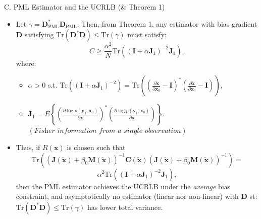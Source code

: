\documentclass{beamer}
\begin{document}
\begin{frame}{C. PML Estimator and the UCRLB (\& Theorem 1)}
\begin{itemize}
    \item Let $\gamma = \mathbf{D}_{\text{PML}}^{*} \mathbf{D}_{\text{PML}}$. Then, from Theorem 1, any estimator with bias gradient $\mathbf{D}$ satisfying $\text{Tr}(\mathbf{D}^{*}\mathbf{D}) \leq \text{Tr}(\gamma)$ must satisfy:
    \begin{equation*}
    C \geq \frac{\alpha^2}{N} \text{Tr}\left((\mathbf{I} + \alpha \mathbf{J}_1)^{-2} \mathbf{J}_1\right),
    \end{equation*}
    where: 
    \begin{itemize}
        \item $\alpha > 0$ s.t. \(
            \text{Tr}\left((\mathbf{I} + \alpha \mathbf{J}_1)^{-2}\right) = \text{Tr}\left(\left(\frac{\partial \check{\mathbf{x}}}{\partial \mathbf{x}_0} - \mathbf{I}\right)^* \left(\frac{\partial \check{\mathbf{x}}}{\partial \mathbf{x}_0} - \mathbf{I}\right)\right),
            \)
        \item $\mathbf{J}_1 = E\left\{\left(\frac{\partial \log p(\mathbf{y}_1;\mathbf{x}_0)}{\partial \mathbf{x}}\right)^* \left(\frac{\partial \log p(\mathbf{y}_1;\mathbf{x}_0)}{\partial \mathbf{x}}\right)\right\}$. \(\scriptstyle (\textit{Fisher information from a single observation})\)
    \end{itemize}

    \item Thus, if $R(\mathbf{x})$ is chosen such that 
    \[
    \text{Tr}\left((\mathbf{J}(\check{\mathbf{x}}) + \beta_0 \mathbf{M}(\check{\mathbf{x}}))^{-1} \mathbf{C}(\check{\mathbf{x}}) (\mathbf{J}(\check{\mathbf{x}}) + \beta_0 \mathbf{M}(\check{\mathbf{x}}))^{-1}\right) =
    \]
    \[
    \alpha^2 \text{Tr}\left((\mathbf{I} + \alpha \mathbf{J}_1)^{-2} \mathbf{J}_1\right),
    \]
    then the PML estimator achieves the UCRLB under the \textit{average} bias constraint, and asymptotically no estimator (linear nor non-linear) with $\mathbf{D}$ st: $\text{Tr}(\mathbf{D}^{*} \mathbf{D}) \leq \text{Tr}(\gamma)$ has lower total variance.
\end{itemize}
\end{frame}
\end{document}
